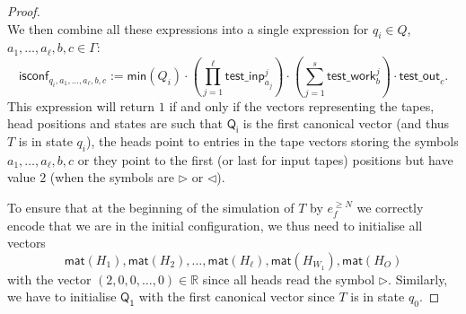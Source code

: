 \begin{proof}
$$    $$
    We then combine all these expressions into a single expression for $q_i\in Q$, 
    $a_1,\ldots,a_\ell,b,c\in\Gamma$:
    $$
    \mathsf{isconf}_{q_i,a_1,\ldots,a_\ell,b,c}:=
    \mathsf{min}(Q_i)\cdot \left(\prod_{j=1}^{\ell} \mathsf{test\_inp}_{a_j}^j\right)
    \cdot\left(\sum_{j=1}^s \mathsf{test\_work}_b^j\right)\cdot \mathsf{test\_out}_{c}.
    $$
    This expression will return $1$ if and only if the vectors representing the tapes, 
    head positions and states are such that $\mathsf{Q_i}$ is the first canonical vector 
    (and thus $T$ is in state $q_i$), the heads point to entries in the tape vectors storing 
    the symbols $a_1,\ldots,a_{\ell}, b,c$ or they point to the first (or last for input tapes) 
    positions but have value $2$ (when the symbols are $\rhd$ or $\lhd$). 

    To ensure that at the beginning of the simulation of $T$ by $e_f^{\geq N}$ we correctly encode 
    that we are in the initial configuration, we thus need to initialise all vectors 
    $$\mathsf{mat}(H_1),\mathsf{mat}(H_2),\ldots, \mathsf{mat}(H_\ell), \mathsf{mat}(H_{W_1}),\mathsf{mat}(H_O)$$
    with the vector $(2,0,0,\ldots,0)\in\mathbb{R}$ since all heads read the symbol $\rhd$. Similarly, 
    we have to initialise $\mathsf{Q_1}$ with the first canonical vector since $T$ is in state $q_0$.


\end{proof}
